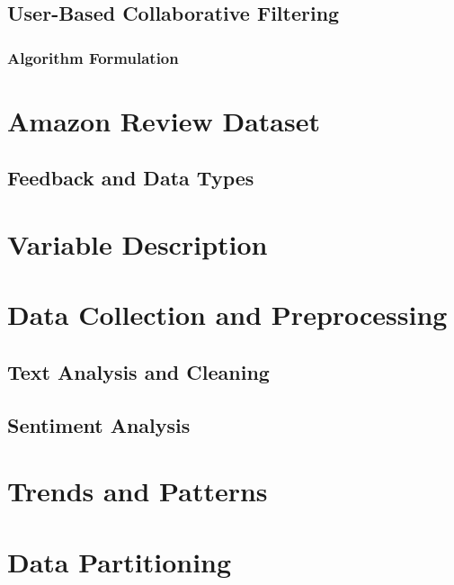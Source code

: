 \subsection{User-Based Collaborative Filtering}
\label{subsec:User-Based Collaborative Filtering}

\subsubsection{Algorithm Formulation}
\label{subsubsec:Algorithm Formulation}





\section{Amazon Review Dataset}
\label{subsec:Amazon Review Dataset}

\subsection{Feedback and Data Types}
\label{subsubsec:Feedback and Data Types}

\section{Variable Description}
\label{sec:Variable Description}

\section{Data Collection and Preprocessing}
\label{sec:Data Collection and Preprocessing}

\subsection{Text Analysis and Cleaning}
\label{subsec:Text Analysis and Cleaning}

\subsection{Sentiment Analysis}
\label{subsec:Sentiment Analysis}

\section{Trends and Patterns}
\label{sec:Trends and Patterns}

\section{Data Partitioning}
\label{sec:Data Partitioning}

